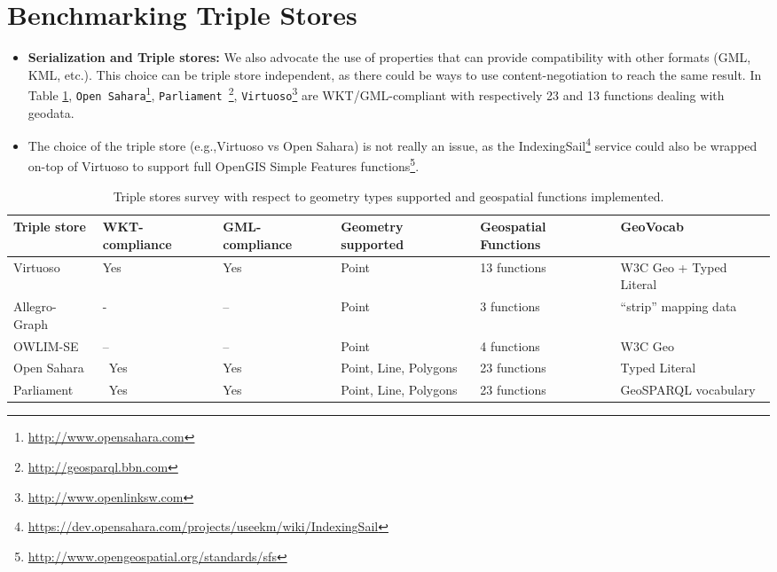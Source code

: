 \section{Benchmarking Triple Stores}

\begin{itemize}
\item \textbf{Serialization and Triple stores:} We also advocate the use of properties that can provide compatibility with other formats (GML, KML, etc.). This choice can be triple store independent, as there could be ways to use content-negotiation to reach the same result. In Table \ref{tab:triplestore}, \texttt{Open Sahara}\footnote{\url{http://www.opensahara.com}}, \texttt{Parliament }\footnote{\url{http://geosparql.bbn.com}},  \texttt{Virtuoso}\footnote{\url{http://www.openlinksw.com}} are WKT/GML-compliant with respectively 23 and 13 functions dealing with geodata.
\item The choice of the triple store (e.g.,Virtuoso vs Open Sahara) is not really an issue, as the IndexingSail\footnote{\url{https://dev.opensahara.com/projects/useekm/wiki/IndexingSail}} service could also be wrapped on-top of Virtuoso to support full OpenGIS Simple Features functions\footnote{\url{http://www.opengeospatial.org/standards/sfs}}.
\end{itemize}

\begin{table}[!htbp]
 \begin{tabularx}{\textwidth}{|X|X|X|X|X|l|}
 \hline
 \textbf{Triple store} & WKT-compliance & GML-compliance & Geometry supported  & Geospatial Functions & GeoVocab \\ \hline
 Virtuoso & Yes & Yes & Point & 13 functions & W3C Geo + Typed Literal  \\ \hline
 Allegro-Graph & \-- & -- & Point & 3 functions & ``strip'' mapping data \\ \hline
 OWLIM-SE & -- & -- & Point & 4 functions & W3C Geo\\ \hline
 Open Sahara & \ Yes & Yes & Point, Line, Polygons & 23 functions  & Typed Literal \\ \hline
 Parliament & \ Yes & Yes & Point, Line, Polygons & 23 functions  &  GeoSPARQL vocabulary\\ \hline
 \end{tabularx}
\caption{Triple stores survey with respect to geometry types supported and geospatial functions implemented.}
\label{tab:triplestore}
\end{table}

